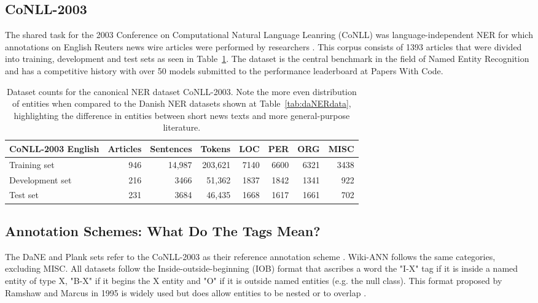 \documentclass[main.tex]{subfiles}
\begin{document}
\subsection{CoNLL-2003}
The shared task for the 2003 Conference on Computational Natural Language Leanring (CoNLL) was language-independent NER for which annotations on English Reuters news wire articles were performed by researchers \cite{tjang2003conll}.
This corpus consists of 1393 articles that were divided into training, development and test sets as seen in Table~\ref{tab:conll2003}.
The dataset is the central benchmark in the field of Named Entity Recognition \cite[Sec. 4.3]{yamada2020luke} and has a competitive history with over 50 models submitted to the performance leaderboard at Papers With Code\footnotemark.
\begin{table}[H]
    \centering
    \begin{tabular}{l|rrr|rrrr}
    CoNLL-2003 English  & Articles  & Sentences  & Tokens   & LOC   & PER   & ORG   & MISC  \\ \hline
    Training set        & 946       & 14,987     & 203,621  & 7140  & 6600  & 6321  & 3438   \\
    Development set     & 216       & 3466      & 51,362   & 1837  & 1842  & 1341  & 922    \\
    Test set            & 231       & 3684      & 46,435   & 1668  & 1617  & 1661  & 702    \\
    \end{tabular}
    \caption{
        Dataset counts for the canonical NER dataset CoNLL-2003.
        Note the more even distribution of entities when compared to the Danish NER datasets shown at Table~\ref{tab:daNERdata}, highlighting the difference in entities between short news texts and more general-purpose literature.
    }
    \label{tab:conll2003}
\end{table}

\subsection{Annotation Schemes: What Do The Tags Mean?}
\label{subsec:annoschemes}
The DaNE and Plank sets refer to the CoNLL-2003 as their reference annotation scheme \cite[Sec. 4]{hvingelby2020dane} \cite[Sec. 2.1]{plank2019neural}.
Wiki-ANN follows the same categories, excluding MISC.
All datasets follow the Inside-outside-beginning (IOB) format that ascribes a word the "I-X" tag if it is inside a named entity of type X, "B-X" if it begins the X entity and "O" if it is outside named entities (e.g. the null class).
This format proposed by Ramshaw and Marcus in 1995 is widely used but does allow entities to be nested or to overlap \cite{ramshaw1995IOB}.
\end{document}
